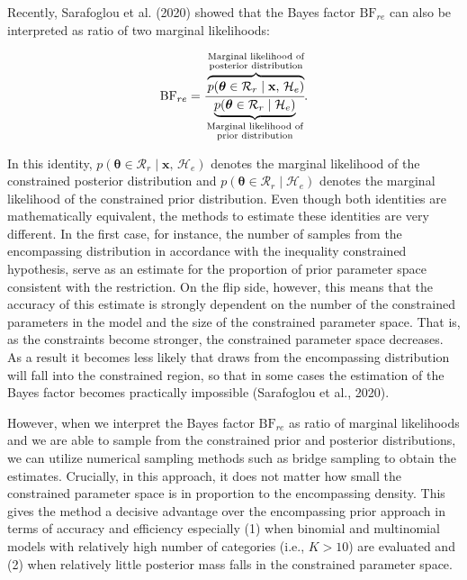 \documentclass[
  english,
  man,floatsintext]{apa6}
\begin{document}
Recently, Sarafoglou et al. (2020) showed that the Bayes factor \(\text{BF}_{re}\) can also be interpreted as ratio of two marginal likelihoods:

\begin{align}
\label{Eq:sarafoglouIdentity}
\text{BF}_{re} =
\cfrac{\overbrace{p(\boldsymbol{\theta} \in \mathcal{R}_r \mid \mathbf{x}\text{, }\mathcal{H}_e)}^{\substack{\text{Marginal likelihood of}\\\text{posterior distribution}}}}{\underbrace{p(\boldsymbol{\theta} \in \mathcal{R}_r \mid  \mathcal{H}_e)}_{\substack{\text{Marginal likelihood of}\\\text{prior distribution}}}}.
\end{align}

In this identity, \(p(\boldsymbol{\theta} \in \mathcal{R}_r \mid \mathbf{x}\text{, }\mathcal{H}_e)\) denotes the marginal likelihood of the constrained posterior distribution and \(p(\boldsymbol{\theta} \in \mathcal{R}_r \mid \mathcal{H}_e)\) denotes the marginal likelihood of the constrained prior distribution. Even though both identities are mathematically equivalent, the methods to estimate these identities are very different.
In the first case, for instance, the number of samples from the encompassing distribution in accordance with the inequality constrained hypothesis, serve as an estimate for the proportion of prior parameter space consistent with the restriction. On the flip side, however, this means that the accuracy of this estimate is strongly dependent on the number of the constrained parameters in the model and the size of the constrained parameter space. That is, as the constraints become stronger, the constrained parameter space decreases. As a result it becomes less likely that draws from the encompassing distribution will fall into the constrained region, so that in some cases the estimation of the Bayes factor becomes practically impossible (Sarafoglou et al., 2020).

However, when we interpret the Bayes factor \(\text{BF}_{re}\) as ratio of marginal likelihoods and we are able to sample from the constrained prior and posterior distributions, we can utilize numerical sampling methods such as bridge sampling to obtain the estimates. Crucially, in this approach, it does not matter how small the constrained parameter space is in proportion to the encompassing density. This gives the method a decisive advantage over the encompassing prior approach in terms of accuracy and efficiency especially (1) when binomial and multinomial models with relatively high number of categories (i.e., \(K > 10\)) are evaluated and (2) when relatively little posterior mass falls in the constrained parameter space.
\end{document}
